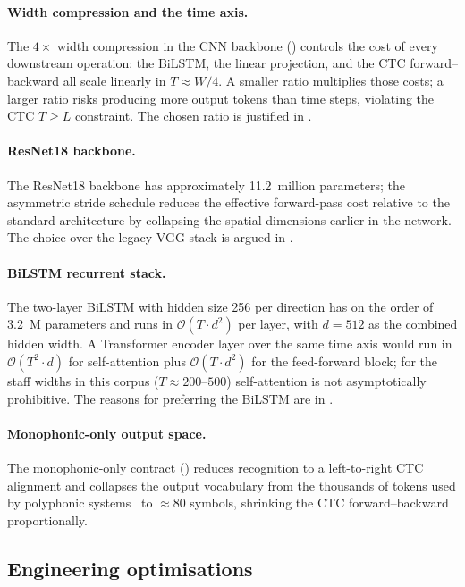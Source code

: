 \paragraph{Width compression and the time axis.}
The $4\times$ width compression in the CNN backbone
() controls the cost of every downstream
operation: the BiLSTM, the linear projection, and the CTC
forward--backward all scale linearly in $T \approx W/4$.
A smaller ratio multiplies those costs; a larger ratio risks producing
more output tokens than time steps, violating the CTC
$T \geq L$ constraint. The chosen ratio is justified in
.

\paragraph{ResNet18 backbone.}
The ResNet18 backbone has approximately \num{11.2}~million parameters;
the asymmetric stride schedule reduces the effective forward-pass cost
relative to the standard architecture by collapsing the spatial
dimensions earlier in the network.
The choice over the legacy VGG stack is argued in .

\paragraph{BiLSTM recurrent stack.}
The two-layer BiLSTM with hidden size \num{256} per direction has on
the order of \num{3.2}~M parameters and runs in
$\mathcal{O}(T\cdot d^2)$ per layer, with $d = 512$ as the combined
hidden width.
A Transformer encoder layer over the same time axis would run in
$\mathcal{O}(T^2\cdot d)$ for self-attention plus
$\mathcal{O}(T\cdot d^2)$ for the feed-forward block; for the staff
widths in this corpus ($T \approx 200$--$500$) self-attention is not
asymptotically prohibitive. The reasons for preferring the BiLSTM are
in .

\paragraph{Monophonic-only output space.}
The monophonic-only contract () reduces
recognition to a left-to-right CTC alignment and collapses the output
vocabulary from the thousands of tokens used by polyphonic
systems~\cite{riosVilaSheetMusicTransformer2024} to $\approx 80$
symbols, shrinking the CTC forward--backward proportionally.

\subsection{Engineering optimisations}

